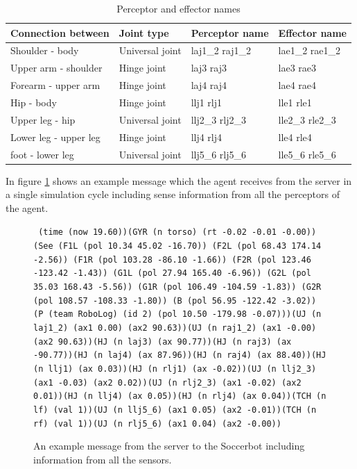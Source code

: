 \begin{table}
\label {table:perceptorNames}
\caption{Perceptor and effector names}
\begin{center}
\begin{tabular}{|l|l|l|l|}
\hline
{\bf Connection between}  & {\bf Joint type} & {\bf Perceptor name}& {\bf
Effector name} \\
\hline
Shoulder - body  & Universal joint & laj1\_2  raj1\_2 & lae1\_2   rae1\_2 \\
\hline
Upper arm - shoulder  & Hinge joint & laj3  raj3 & lae3   rae3 \\
\hline
Forearm - upper arm  & Hinge joint & laj4  raj4 & lae4   rae4 \\
\hline
Hip - body  & Hinge joint & llj1  rlj1 & lle1   rle1 \\
\hline
Upper leg - hip & Universal joint & llj2\_3  rlj2\_3 & lle2\_3   rle2\_3 \\
\hline
Lower leg - upper leg & Hinge joint & llj4  rlj4 & lle4   rle4 \\
\hline
foot - lower leg & Universal joint & llj5\_6  rlj5\_6 & lle5\_6   rle5\_6 \\
\hline
\end{tabular}
\end{center}
\end{table}

In figure \ref{fig:examplemsg} shows an example message which the agent receives from the server in a single simulation cycle including sense information from all the perceptors of the agent.

\begin{figure}[htb]
\centering
\parbox{\textwidth}{
\texttt{
(time (now 19.60))(GYR (n torso) (rt -0.02 -0.01 -0.00))(See (F1L (pol 10.34 45.02 -16.70)) (F2L (pol 68.43 174.14 -2.56)) (F1R (pol 103.28 -86.10 -1.66)) (F2R (pol 123.46 -123.42 -1.43)) (G1L (pol 27.94 165.40 -6.96)) (G2L (pol 35.03 168.43 -5.56)) (G1R (pol 106.49 -104.59 -1.83)) (G2R (pol 108.57 -108.33 -1.80)) (B (pol 56.95 -122.42 -3.02)) (P (team RoboLog) (id 2) (pol 10.50 -179.98 -0.07)))(UJ (n laj1\_2) (ax1 0.00) (ax2 90.63))(UJ (n raj1\_2) (ax1 -0.00) (ax2 90.63))(HJ (n laj3) (ax 90.77))(HJ (n raj3) (ax -90.77))(HJ (n laj4) (ax 87.96))(HJ (n raj4) (ax 88.40))(HJ (n llj1) (ax 0.03))(HJ (n rlj1) (ax -0.02))(UJ (n llj2\_3) (ax1 -0.03) (ax2 0.02))(UJ (n rlj2\_3) (ax1 -0.02) (ax2 0.01))(HJ (n llj4) (ax 0.05))(HJ (n rlj4) (ax 0.04))(TCH (n lf) (val 1))(UJ (n llj5\_6) (ax1 0.05) (ax2 -0.01))(TCH (n rf) (val 1))(UJ (n rlj5\_6) (ax1 0.04) (ax2 -0.00))}
}
\caption{An example message from the server to the Soccerbot including information from all the sensors.}
\label{fig:examplemsg}
\end{figure}


